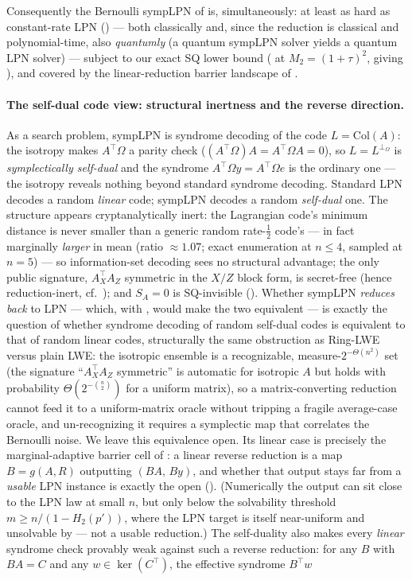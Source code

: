 \documentclass[11pt,a4paper]{article}
\theoremstyle{plain}
\theoremstyle{definition}
\begin{document}
Consequently the Bernoulli sympLPN of  is, simultaneously: at least as hard as constant-rate LPN () --- both classically and, since the reduction is classical and polynomial-time, also \emph{quantumly} (a quantum sympLPN solver yields a quantum LPN solver) --- subject to our exact SQ lower bound ( at $M_2=(1+\tau)^2$, giving ), and covered by the linear-reduction barrier landscape of .

\paragraph{The self-dual code view: structural inertness and the reverse direction.} As a search problem, sympLPN is syndrome decoding of the code $L=\mathrm{Col}(A)$: the isotropy makes $A^{\top}\Omega$ a parity check ($(A^{\top}\Omega)A=A^{\top}\Omega A=0$), so $L=L^{\perp_\Omega}$ is \emph{symplectically self-dual} and the syndrome $A^{\top}\Omega y=A^{\top}\Omega e$ is the ordinary one --- the isotropy reveals nothing beyond standard syndrome decoding. Standard LPN decodes a random \emph{linear} code; sympLPN decodes a random \emph{self-dual} one. The structure appears cryptanalytically inert: the Lagrangian code's minimum distance is never smaller than a generic random rate-$\tfrac12$ code's --- in fact marginally \emph{larger} in mean (ratio $\approx 1.07$; exact enumeration at $n\le 4$, sampled at $n=5$) --- so information-set decoding sees no structural advantage; the only public signature, $A_X^{\top}A_Z$ symmetric in the $X/Z$ block form, is secret-free (hence reduction-inert, cf.\ ); and $S_A=0$ is SQ-invisible (). Whether sympLPN \emph{reduces back} to LPN --- which, with , would make the two equivalent --- is exactly the question of whether syndrome decoding of random self-dual codes is equivalent to that of random linear codes, structurally the same obstruction as Ring-LWE versus plain LWE: the isotropic ensemble is a recognizable, measure-$2^{-\Theta(n^2)}$ set (the signature ``$A_X^{\top}A_Z$ symmetric'' is automatic for isotropic $A$ but holds with probability $\Theta(2^{-\binom n2})$ for a uniform matrix), so a matrix-converting reduction cannot feed it to a uniform-matrix oracle without tripping a fragile average-case oracle, and un-recognizing it requires a symplectic map that correlates the Bernoulli noise. We leave this equivalence open. Its linear case is precisely the marginal-adaptive barrier cell of : a linear reverse reduction is a map $B=g(A,R)$ outputting $(BA,\,By)$, and whether that output stays far from a \emph{usable} LPN instance is exactly the open  (). (Numerically the output can sit close to the LPN law at small $n$, but only below the solvability threshold $m\ge n/(1-H_2(p'))$, where the LPN target is itself near-uniform and unsolvable by  --- not a usable reduction.) The self-duality also makes every \emph{linear} syndrome check provably weak against such a reverse reduction: for any $B$ with $BA=C$ and any $w\in\ker(C^{\top})$, the effective syndrome $B^{\top}w$ 
\end{document}
